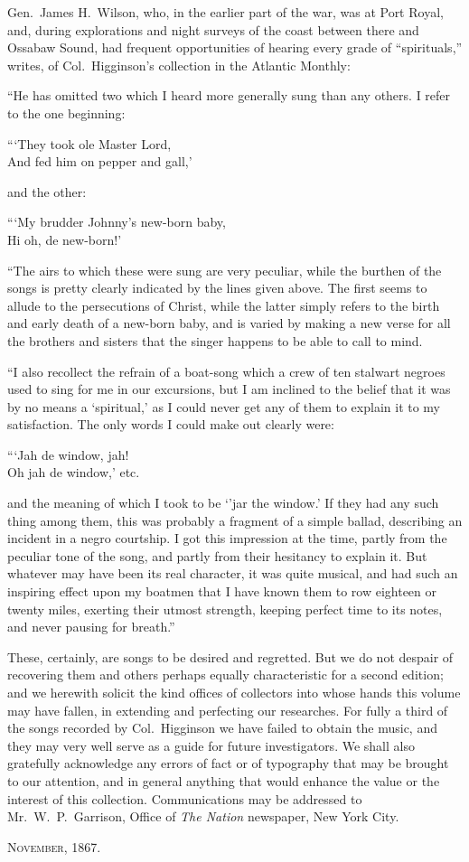 \documentclass[a5paper,10pt]{book}
\begin{document}
Gen.~James H.~Wilson, who, in the earlier part of the war, was at Port
Royal, and, during explorations and night surveys of the coast between
there and Ossabaw Sound, had frequent opportunities of hearing every
grade of ``spirituals,'' writes, of Col.~Higginson's collection in the
Atlantic Monthly:

``He has omitted two which I heard more generally sung than any
others.  I refer to the one beginning:

``{}`They took ole Master Lord,\\
And fed him on pepper and gall,'

and the other:

``{}`My brudder Johnny's new-born baby,\\
Hi oh, de new-born!'

``The airs to which these were sung are very peculiar, while the
burthen of the songs is pretty clearly indicated by the lines given
above.  The first seems to allude to the persecutions of Christ, while
the latter simply refers to the birth and early death of a new-born
baby, and is varied by making a new verse for all the brothers and
sisters that the singer happens to be able to call to mind.

``I also recollect the refrain of a boat-song which a crew of ten
stalwart negroes used to sing for me in our excursions, but I am
inclined to the belief that it was by no means a `spiritual,' as I
could never get any of them to explain it to my satisfaction.  The
only words I could make out clearly were:

``{}`Jah de window, jah!\\
Oh jah de window,' etc.

and the meaning of which I took to be `{}'jar the window.'  If they
had any such thing among them, this was probably a fragment of a
simple ballad, describing an incident in a negro courtship.  I got
this impression at the time, partly from the peculiar tone of the
song, and partly from their hesitancy to explain it.  But whatever may
have been its real character, it was quite musical, and had such an
inspiring effect upon my boatmen that I have known them to row
eighteen or twenty miles, exerting their utmost strength, keeping
perfect time to its notes, and never pausing for breath.''

These, certainly, are songs to be desired and regretted.  But we do
not despair of recovering them and others perhaps equally
characteristic for a second edition; and we herewith solicit the kind
offices of collectors into whose hands this volume may have fallen, in
extending and perfecting our researches.  For fully a third of the
songs recorded by Col.~Higginson we have failed to obtain the music,
and they may very well serve as a guide for future investigators.  We
shall also gratefully acknowledge any errors of fact or of typography
that may be brought to our attention, and in general anything that
would enhance the value or the interest of this collection.
Communications may be addressed to Mr.~W.~P.~Garrison, Office of
\emph{The Nation} newspaper, New York City.

\textsc{November}, 1867. 
\end{document}
